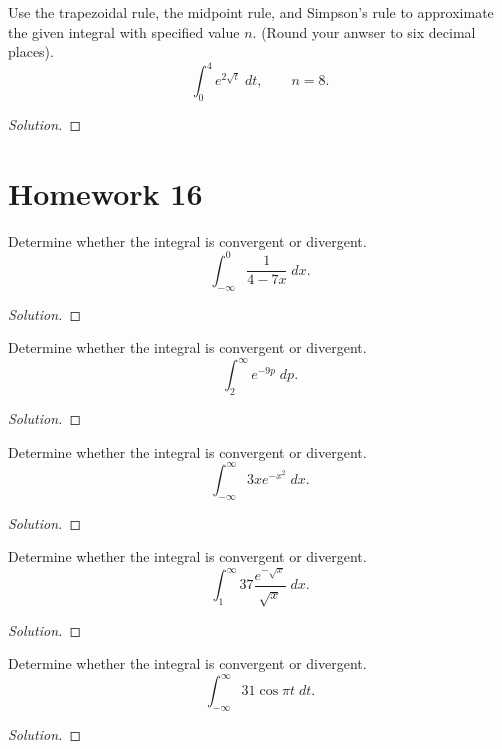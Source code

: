 \begin{problem}[WebAssign, HW 15, \# 6]
Use the trapezoidal rule, the midpoint rule, and Simpson's rule to
approximate the given integral with specified value $n$. (Round your anwser
to six decimal places).
\[
\int_0^4 e^{2\sqrt{t}}\;dt,\qquad n=8.
\]
\end{problem}
\begin{proof}[Solution]
\end{proof}

\section{Homework 16}
\begin{problem}[WebAssign, HW 16, \# 1]
Determine whether the integral is convergent or divergent.
\[
\int_{-\infty}^0\frac{1}{4-7x}\;dx.
\]
\end{problem}
\begin{proof}[Solution]
\end{proof}

\begin{problem}[WebAssign, HW 16, \# 2]
Determine whether the integral is convergent or divergent.
\[
\int_2^{\infty} e^{-9p}\;dp.
\]
\end{problem}
\begin{proof}[Solution]
\end{proof}

\begin{problem}[WebAssign, HW 16, \# 3]
Determine whether the integral is convergent or divergent.
\[
\int_{-\infty}^\infty 3xe^{-x^2}\;dx.
\]
\end{problem}
\begin{proof}[Solution]
\end{proof}

\begin{problem}[WebAssign, HW 16, \# 4]
Determine whether the integral is convergent or divergent.
\[
\int_1^\infty 37\frac{e^{-\sqrt{x}}}{\sqrt{x}}\;dx.
\]
\end{problem}
\begin{proof}[Solution]
\end{proof}

\begin{problem}[WebAssign, HW 16, \# 5]
Determine whether the integral is convergent or divergent.
\[
\int_{-\infty}^\infty 31\cos\pi t\;dt.
\]
\end{problem}
\begin{proof}[Solution]
\end{proof}

